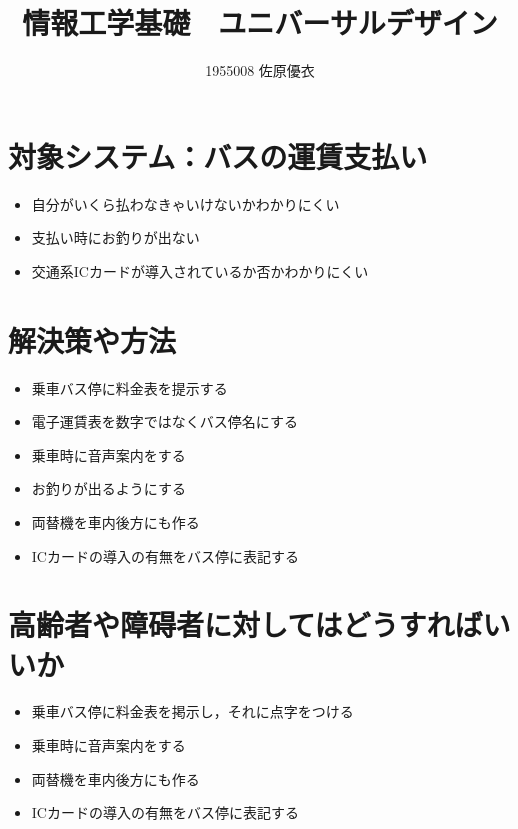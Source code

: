 \documentclass{jsarticle}
\title{情報工学基礎　ユニバーサルデザイン}
\author{1955008	佐原優衣}
\date{}
\begin{document}
\maketitle

\section*{対象システム：バスの運賃支払い}
\begin{itemize}
  \item 自分がいくら払わなきゃいけないかわかりにくい
  \item 支払い時にお釣りが出ない
  \item 交通系ICカードが導入されているか否かわかりにくい
\end{itemize}
\section*{解決策や方法}
\begin{itemize}
  \item 乗車バス停に料金表を提示する
  \item 電子運賃表を数字ではなくバス停名にする
  \item 乗車時に音声案内をする
  \item お釣りが出るようにする
  \item 両替機を車内後方にも作る
  \item ICカードの導入の有無をバス停に表記する
\end{itemize}
\section*{高齢者や障碍者に対してはどうすればいいか}
\begin{itemize}
  \item 乗車バス停に料金表を掲示し，それに点字をつける
  \item 乗車時に音声案内をする
  \item 両替機を車内後方にも作る
  \item ICカードの導入の有無をバス停に表記する
\end{itemize}
\end{document}
